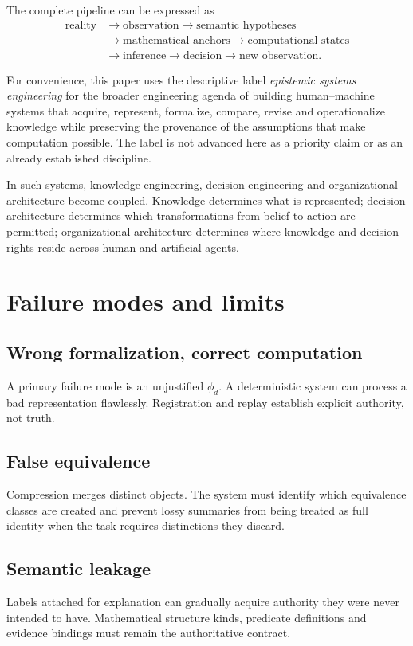 \documentclass[11pt,a4paper]{article}
\begin{document}
The complete pipeline can be expressed as
\begin{align}
\text{reality} &\rightarrow \text{observation} \rightarrow \text{semantic hypotheses} \\
&\rightarrow \text{mathematical anchors} \rightarrow \text{computational states} \\
&\rightarrow \text{inference} \rightarrow \text{decision} \rightarrow \text{new observation}.
\end{align}

For convenience, this paper uses the descriptive label \emph{epistemic systems engineering} for the broader engineering agenda of building human--machine systems that acquire, represent, formalize, compare, revise and operationalize knowledge while preserving the provenance of the assumptions that make computation possible. The label is not advanced here as a priority claim or as an already established discipline.

In such systems, knowledge engineering, decision engineering and organizational architecture become coupled. Knowledge determines what is represented; decision architecture determines which transformations from belief to action are permitted; organizational architecture determines where knowledge and decision rights reside across human and artificial agents.

\section{Failure modes and limits}
\subsection{Wrong formalization, correct computation}
A primary failure mode is an unjustified $\phi_d$. A deterministic system can process a bad representation flawlessly. Registration and replay establish explicit authority, not truth.

\subsection{False equivalence}
Compression merges distinct objects. The system must identify which equivalence classes are created and prevent lossy summaries from being treated as full identity when the task requires distinctions they discard.

\subsection{Semantic leakage}
Labels attached for explanation can gradually acquire authority they were never intended to have. Mathematical structure kinds, predicate definitions and evidence bindings must remain the authoritative contract.
\end{document}

